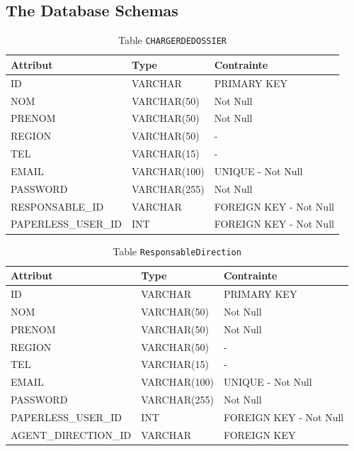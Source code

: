 \subsection{The Database Schemas}
\begin{table}[h!]
\centering
\begin{tabular}{|l|l|l|}
\hline
\textbf{Attribut} & \textbf{Type} & \textbf{Contrainte} \\
\hline
ID & VARCHAR & PRIMARY KEY \\
NOM & VARCHAR(50) & Not Null \\
PRENOM & VARCHAR(50) & Not Null \\
REGION & VARCHAR(50) & - \\
TEL & VARCHAR(15) & - \\
EMAIL & VARCHAR(100) & UNIQUE - Not Null \\
PASSWORD & VARCHAR(255) & Not Null \\
RESPONSABLE\_ID & VARCHAR & FOREIGN KEY - Not Null \\
PAPERLESS\_USER\_ID & INT & FOREIGN KEY - Not Null \\
\hline
\end{tabular}
\caption{Table \texttt{CHARGERDEDOSSIER}}
\end{table}
\begin{table}[h!]
\centering
\begin{tabular}{|l|l|l|}
\hline
\textbf{Attribut} & \textbf{Type} & \textbf{Contrainte} \\
\hline
ID & VARCHAR & PRIMARY KEY \\
NOM & VARCHAR(50) & Not Null \\
PRENOM & VARCHAR(50) & Not Null \\
REGION & VARCHAR(50) & - \\
TEL & VARCHAR(15) & - \\
EMAIL & VARCHAR(100) & UNIQUE - Not Null \\
PASSWORD & VARCHAR(255) & Not Null \\
PAPERLESS\_USER\_ID & INT & FOREIGN KEY - Not Null \\
AGENT\_DIRECTION\_ID & VARCHAR & FOREIGN KEY \\
\hline
\end{tabular}
\caption{Table \texttt{ResponsableDirection}}
\end{table}

